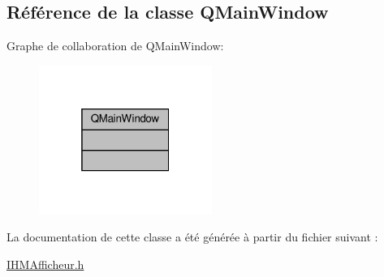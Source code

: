 \hypertarget{class_q_main_window}{}\subsection{Référence de la classe Q\+Main\+Window}
\label{class_q_main_window}


Graphe de collaboration de Q\+Main\+Window\+:
\nopagebreak
\begin{figure}[H]
\begin{center}
\leavevmode
\includegraphics[width=160pt]{class_q_main_window__coll__graph}
\end{center}
\end{figure}


La documentation de cette classe a été générée à partir du fichier suivant \+:\begin{DoxyCompactItemize}
\item 
\hyperlink{_i_h_m_afficheur_8h}{I\+H\+M\+Afficheur.\+h}\end{DoxyCompactItemize}
